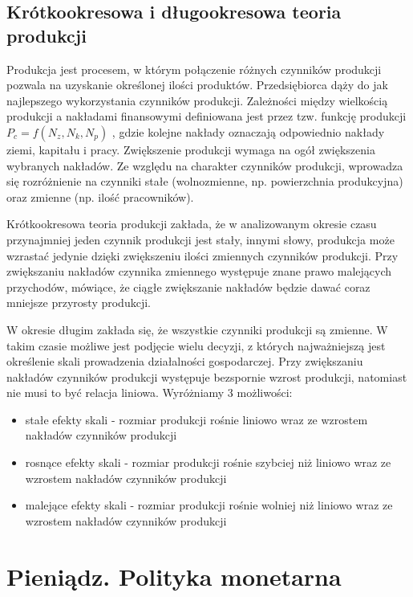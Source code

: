 \documentclass[12pt]{extarticle}
\begin{document}
\subsection{Krótkookresowa i długookresowa teoria produkcji}

Produkcja jest procesem, w którym połączenie różnych czynników produkcji pozwala na uzyskanie określonej ilości produktów. Przedsiębiorca dąży do jak najlepszego wykorzystania czynników produkcji. Zależności między wielkością produkcji a nakładami finansowymi definiowana jest przez tzw. funkcję produkcji $ P_c = f(N_z, N_k, N_p) $ , gdzie kolejne nakłady oznaczają odpowiednio nakłady ziemi, kapitału i pracy. Zwiększenie produkcji wymaga na ogół zwiększenia wybranych nakładów. Ze względu na charakter czynników produkcji, wprowadza się rozróżnienie na czynniki stałe (wolnozmienne, np. powierzchnia produkcyjna) oraz zmienne (np. ilość pracowników).

Krótkookresowa teoria produkcji zakłada, że w analizowanym okresie czasu przynajmniej jeden czynnik produkcji jest stały, innymi słowy, produkcja może wzrastać jedynie dzięki zwiększeniu ilości zmiennych czynników produkcji. Przy zwiększaniu nakładów czynnika zmiennego występuje znane prawo malejących przychodów, mówiące, że ciągłe zwiększanie nakładów będzie dawać coraz mniejsze przyrosty produkcji.

W okresie długim zakłada się, że wszystkie czynniki produkcji są zmienne. W takim czasie możliwe jest podjęcie wielu decyzji, z których najważniejszą jest określenie skali prowadzenia działalności gospodarczej. Przy zwiększaniu nakładów czynników produkcji występuje bezspornie wzrost produkcji, natomiast nie musi to być relacja liniowa. Wyróżniamy 3 możliwości:

\begin{itemize}
	\item stałe efekty skali - rozmiar produkcji rośnie liniowo wraz ze wzrostem nakładów czynników produkcji
	\item rosnące efekty skali - rozmiar produkcji rośnie szybciej niż liniowo wraz ze wzrostem nakładów czynników produkcji
	\item malejące efekty skali - rozmiar produkcji rośnie wolniej niż liniowo wraz ze wzrostem nakładów czynników produkcji
\end{itemize}

\section{Pieniądz. Polityka monetarna}
\end{document}
